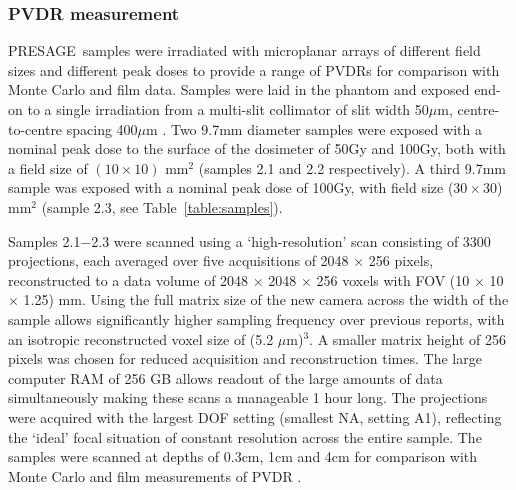 \documentclass[12pt]{article}
\begin{document}
\subsubsection{PVDR measurement}
PRESAGE\textregistered \ samples were irradiated with microplanar arrays of different field sizes and different peak doses to provide a range of PVDRs for comparison with Monte Carlo and film data. Samples were laid in the phantom and exposed end-on to a single irradiation from a multi-slit collimator of slit width 50$\mu$m, centre-to-centre spacing 400$\mu$m \cite{brauer2009new}. Two 9.7mm diameter samples were exposed with a nominal peak dose to the surface of the dosimeter of 50Gy and 100Gy, both with a field size of $(10 \times 10)$ mm$^2$ (samples 2.1 and 2.2 respectively). A third 9.7mm sample was exposed with a nominal peak dose of 100Gy, with field size ($30 \times 30$) mm$^2$ (sample 2.3, see Table~\ref{table:samples}). 

Samples 2.1−2.3 were scanned using a `high-resolution' scan consisting of 3300 projections, each averaged over five acquisitions of 2048 $\times$ 256 pixels, reconstructed to a data volume of 2048 $\times$ 2048 $\times$ 256 voxels with FOV (10 $\times$ 10 $\times$ 1.25) mm. Using the full matrix size of the new camera across the width of the sample allows significantly higher sampling frequency over previous reports, with an isotropic reconstructed voxel size of (5.2 $\mu$m)$^3$. A smaller matrix height of 256 pixels was chosen for reduced acquisition and reconstruction times. The large computer RAM of 256 GB allows readout of the large amounts of data simultaneously making these scans a manageable 1 hour long. The projections were acquired with the largest DOF setting (smallest NA, setting A1), reflecting the `ideal' focal situation of constant resolution across the entire sample. The samples were scanned at depths of 0.3cm, 1cm and 4cm for comparison with Monte Carlo and film measurements of PVDR \cite{martinez-roviradevelopment2012}. 
\end{document}
